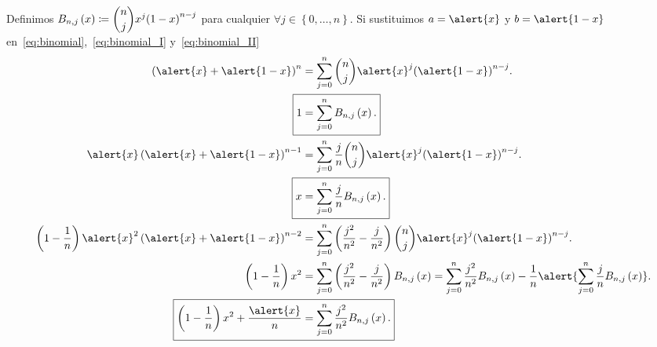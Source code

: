\begin{frame}
    Definimos
    \begin{math}
        B_{n,j}\left(x\right)\coloneqq
        \dbinom{n}{j}
        x^{j}
            {\left(1-x\right)}^{n-j}
    \end{math}
    para cualquier
    \begin{math}
        \forall j\in\left\{0,\dotsc,n\right\}
    \end{math}.
    Si sustituimos $a=\alert{x}$ y $b=\alert{1-x}$
    en~\eqref{eq:binomial},~\eqref{eq:binomial_I}
    y~\eqref{eq:binomial_II}
    \begin{align}
        \left(\alert{x}+\alert{1-x}\right)^{n} & =
        \sum\limits_{j=0}^{n}
        \dbinom{n}{j}
        \alert{x}^{j}
        {\left(\alert{1-x}\right)}^{n-j}. \notag   \\
        \Aboxed{
        1                                      & =
            \sum\limits_{j=0}^{n}
            B_{n,j}\left(x\right).
        }                                          \\
        \alert{x}\left(\alert{x}+\alert{1-x}\right)^{n-1}
                                               & =
        \sum\limits_{j=0}^{n}
        \dfrac{j}{n}
        \dbinom{n}{j}
        \alert{x}^{j}
        {\left(\alert{1-x}\right)}^{n-j}. \notag   \\
        \Aboxed{
            x
                                               & =
            \sum\limits_{j=0}^{n}
            \dfrac{j}{n}
            B_{n,j}\left(x\right).
        }                                          \\
        \left(1-\dfrac{1}{n}\right)
        \alert{x}^{2}
        \left(\alert{x}+\alert{1-x}\right)^{n-2}
                                               & =
        \sum\limits_{j=0}^{n}
        \left(
        \dfrac{j^{2}}{n^{2}}-
        \dfrac{j}{n^{2}}
        \right)
        \dbinom{n}{j}
        \alert{x}^{j}
        {\left(\alert{1-x}\right)}^{n-j}.
        \notag                                     \\
        \left(1-\dfrac{1}{n}\right)
        x^{2}
                                               & =
        \sum\limits_{j=0}^{n}
        \left(
        \dfrac{j^{2}}{n^{2}}-
        \dfrac{j}{n^{2}}
        \right)
        B_{n,j}\left(x\right)=
        \sum\limits_{j=0}^{n}
        \dfrac{j^{2}}{n^{2}}
        B_{n,j}\left(x\right)-
        \dfrac{1}{n}
        \alert{
            \sum\limits_{j=0}^{n}
            \dfrac{j}{n}
            B_{n,j}\left(x\right)
        }.
        \notag                                     \\
        \Aboxed{
            \left(1-\dfrac{1}{n}\right)
            x^{2}+
            \dfrac{\alert{x}}{n}
                                               & =
            \sum\limits_{j=0}^{n}
            \dfrac{j^{2}}{n^{2}}
            B_{n,j}\left(x\right).
        }
    \end{align}
\end{frame}